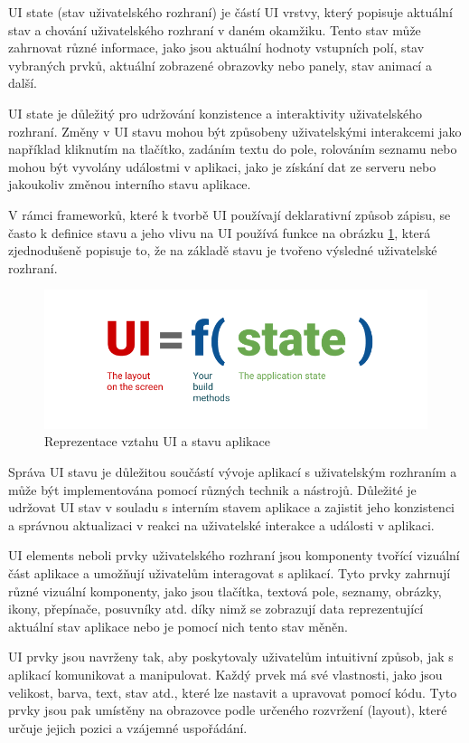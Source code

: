  \label{UIStateParagraph}
UI state (stav uživatelského rozhraní) je částí UI vrstvy, který popisuje aktuální stav a chování uživatelského 
rozhraní v daném okamžiku. Tento stav může zahrnovat různé informace, jako jsou aktuální hodnoty vstupních polí, stav vybraných prvků,
 aktuální zobrazené obrazovky nebo panely, stav animací a další.

UI state je důležitý pro udržování konzistence a interaktivity uživatelského rozhraní. Změny v UI stavu mohou být způsobeny uživatelskými
interakcemi jako například kliknutím na tlačítko, zadáním textu do pole, rolováním seznamu nebo mohou být vyvolány událostmi v aplikaci,
jako je získání dat ze serveru nebo jakoukoliv změnou interního stavu aplikace. 

V rámci frameworků, které k tvorbě UI používají deklarativní způsob zápisu, se často k definice stavu a jeho vlivu na UI používá funkce 
na obrázku \ref{fig:UI_function}, která zjednodušeně popisuje to, že na základě stavu je tvořeno výsledné uživatelské rozhraní.

\begin{figure}[H]
  \centering
  \includegraphics[width=.5\textwidth]{ui-equals-function-of-state.png}
  \caption{Reprezentace vztahu UI a stavu aplikace}
  \label{fig:UI_function}
\end{figure}

Správa UI stavu je důležitou součástí vývoje aplikací s uživatelským rozhraním a může být implementována pomocí různých technik a nástrojů.
Důležité je udržovat UI stav v souladu s interním stavem aplikace a zajistit jeho konzistenci a správnou aktualizaci v reakci na uživatelské 
interakce a události v aplikaci.

UI elements neboli prvky uživatelského rozhraní jsou komponenty tvořící vizuální část aplikace a umožňují uživatelům interagovat s aplikací.
Tyto prvky zahrnují různé vizuální komponenty, jako jsou tlačítka, textová pole, seznamy, obrázky, ikony, přepínače, posuvníky atd. díky nimž
se zobrazují data reprezentující aktuální stav aplikace nebo je pomocí nich tento stav měněn.

UI prvky jsou navrženy tak, aby poskytovaly uživatelům intuitivní způsob, jak s aplikací komunikovat a manipulovat. Každý prvek má své 
vlastnosti, jako jsou velikost, barva, text, stav atd., které lze nastavit a upravovat pomocí kódu. Tyto prvky jsou pak umístěny na obrazovce 
podle určeného rozvržení (layout), které určuje jejich pozici a vzájemné uspořádání.

